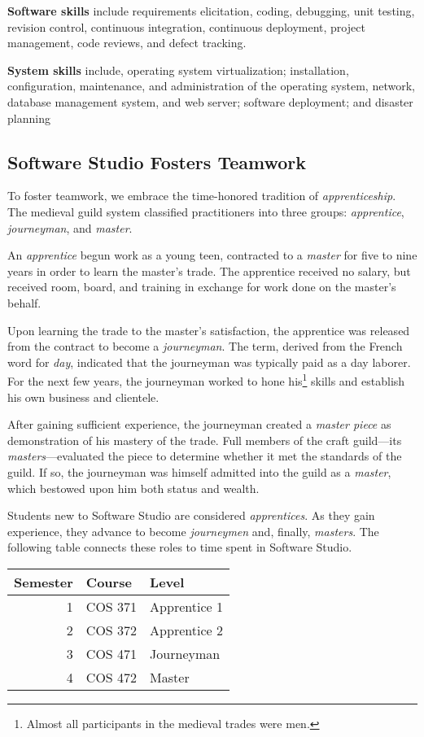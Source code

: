 \documentclass{article}
\begin{document}
\textbf{Software skills} include requirements elicitation, coding, debugging, unit testing,
revision control, continuous integration, continuous deployment,
project management, code reviews, and defect tracking.

\textbf{System skills} include, operating system virtualization; installation, configuration,
maintenance, and administration of the operating system, network, database management
system, and web server; software deployment; and disaster planning
\subsection{Software Studio Fosters Teamwork}
\label{sec:orgheadline8}
To foster teamwork,
we embrace the time-honored tradition of \emph{apprenticeship}.
The medieval guild system classified practitioners into three groups:
\emph{apprentice}, \emph{journeyman}, and \emph{master}.

An \emph{apprentice} begun work as a young teen,
contracted to a \emph{master} for five to nine years
in order to learn the master's trade.
The apprentice received no salary, but received room, board, and training
in exchange for work done on the master's behalf.

Upon learning the trade to the master's satisfaction,
the apprentice was released from the contract to become a \emph{journeyman}.
The term, derived from the French word for \emph{day},
indicated that the journeyman was typically paid as a day laborer.
For the next few years,
the journeyman worked to hone
his\footnote{Almost all participants in the medieval trades were men.}
skills and establish his own business and clientele.

After gaining sufficient experience,
the journeyman created a \emph{master piece}
as demonstration of his mastery of the trade.
Full members of the craft guild---its \emph{masters}---evaluated the piece
to determine whether it met the standards of the guild.
If so, the journeyman was himself admitted into the guild as a \emph{master},
which bestowed upon him both status and wealth.

Students new to Software Studio are considered \emph{apprentices}.
As they gain experience, they advance to become \emph{journeymen} and, finally, \emph{masters}.
The following table connects these roles to time spent in Software Studio.

\begin{center}
\begin{tabular}{rll}
\toprule
Semester & Course & Level\\
\midrule
1 & COS 371 & Apprentice 1\\
2 & COS 372 & Apprentice 2\\
3 & COS 471 & Journeyman\\
4 & COS 472 & Master\\
\bottomrule
\end{tabular}
\end{center}
\end{document}
